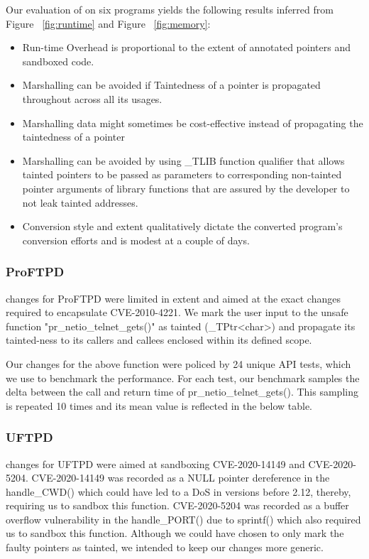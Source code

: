 Our evaluation of \systemname on six programs yields the following results inferred from Figure ~\ref{fig:runtime} and Figure ~\ref{fig:memory}:
\begin{itemize}
  \item Run-time Overhead is proportional to the extent of 
annotated pointers and sandboxed code.
  \item Marshalling can be avoided if Taintedness of a pointer is propagated throughout across all its usages.
  \item Marshalling data might sometimes be cost-effective instead of propagating the taintedness of a pointer
  \item Marshalling can be avoided by using \_TLIB function qualifier that allows tainted pointers to be passed as parameters to corresponding non-tainted pointer arguments of library functions that are assured by the developer to not leak tainted addresses.
  \item Conversion style and extent qualitatively dictate the converted program's conversion efforts and is modest at a couple of days. 
\end{itemize}

\subsubsection{\textbf{ProFTPD}}
\systemname changes for ProFTPD were limited in extent and aimed at the exact changes required to encapsulate CVE-2010-4221. We mark the user input to the unsafe function "pr\_netio\_telnet\_gets()" as tainted (\_TPtr<char>) and propagate its tainted-ness to its callers and callees enclosed within its defined scope.

Our changes for the above function were policed by 24 unique API tests, which we use to benchmark the performance. For each test, our benchmark samples the delta between the call and return time of pr\_netio\_telnet\_gets(). This sampling is repeated 10 times and its mean value is reflected in the below table.

\subsubsection{\textbf{UFTPD}}
\systemname changes for UFTPD were aimed at sandboxing CVE-2020-14149 and CVE-2020-5204. CVE-2020-14149 was recorded as a NULL pointer dereference in the handle\_CWD() which could have led to a DoS in versions before 2.12, thereby, requiring us to sandbox this function. CVE-2020-5204 was recorded as a buffer overflow vulnerability in the handle\_PORT() due to sprintf() which also required us to sandbox this function. Although we could have chosen to only mark the faulty pointers as tainted, we intended to keep our changes more generic.

